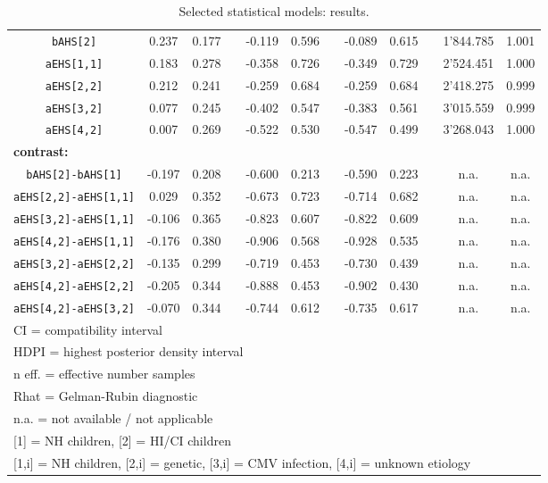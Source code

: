 \begin{table}[h!]
\begin{tabular}{|cccccccccccc|}
		\texttt{bAHS[2]} & 0.237 & 0.177 & & -0.119 & 0.596 & & -0.089 & 0.615 & & 1'844.785 & 1.001 \\
		\texttt{aEHS[1,1]} & 0.183 & 0.278 & & -0.358 & 0.726 & & -0.349 & 0.729 & & 2'524.451 & 1.000 \\
		\texttt{aEHS[2,2]} & 0.212 & 0.241 & & -0.259 & 0.684 & & -0.259 & 0.684 & & 2'418.275 & 0.999 \\
		\texttt{aEHS[3,2]} & 0.077 & 0.245 & & -0.402 & 0.547 & & -0.383 & 0.561 & & 3'015.559 & 0.999 \\
		\texttt{aEHS[4,2]} & 0.007 & 0.269 & & -0.522 & 0.530 & & -0.547 & 0.499 & & 3'268.043 & 1.000 \\
		\multicolumn{12}{|l|}{ \textbf{contrast:} } \\
		\texttt{bAHS[2]-bAHS[1]} & -0.197 & 0.208 & & -0.600 & 0.213 & & -0.590 & 0.223 & & n.a. & n.a. \\
		\texttt{aEHS[2,2]-aEHS[1,1]} & 0.029 & 0.352 & & -0.673 & 0.723 & & -0.714 & 0.682 & & n.a. & n.a. \\
		\texttt{aEHS[3,2]-aEHS[1,1]} & -0.106 & 0.365 & & -0.823 & 0.607 & & -0.822 & 0.609 & & n.a. & n.a. \\
		\texttt{aEHS[4,2]-aEHS[1,1]} & -0.176 & 0.380 & & -0.906 & 0.568 & & -0.928 & 0.535 & & n.a. & n.a. \\
		\texttt{aEHS[3,2]-aEHS[2,2]} & -0.135 & 0.299 & & -0.719 & 0.453 & & -0.730 & 0.439 & & n.a. & n.a. \\
		\texttt{aEHS[4,2]-aEHS[2,2]} & -0.205 & 0.344 & & -0.888 & 0.453 & & -0.902 & 0.430 & & n.a. & n.a. \\
		\texttt{aEHS[4,2]-aEHS[3,2]} & -0.070 & 0.344 & & -0.744 & 0.612 & & -0.735 & 0.617 & & n.a. & n.a. \\
		\hline
		\multicolumn{12}{l}{\footnotesize{CI = compatibility interval}} \\
		\multicolumn{12}{l}{\footnotesize{HDPI = highest posterior density interval}} \\
		\multicolumn{12}{l}{\footnotesize{n eff. = effective number samples}} \\
		\multicolumn{12}{l}{\footnotesize{Rhat = Gelman-Rubin diagnostic}} \\
		\multicolumn{12}{l}{\footnotesize{n.a. = not available / not applicable}} \\
		\multicolumn{12}{l}{\footnotesize{[1] = NH children, [2] = HI/CI children}} \\
		\multicolumn{12}{l}{\footnotesize{[1,i] = NH children, [2,i] = genetic, [3,i] = CMV infection, [4,i] = unknown etiology}} \\
	\end{tabular}
	\caption[Selected statistical models: results]{Selected statistical models: results.}
	\label{tab:results}
\end{table}

